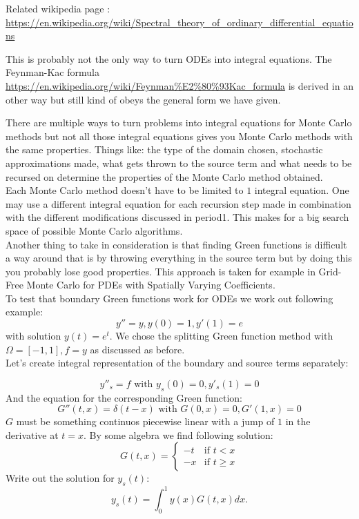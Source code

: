 \documentclass[a4paper,12pt]{article}
\begin{document}
Related wikipedia page :
\url{https://en.wikipedia.org/wiki/Spectral_theory_of_ordinary_differential_equations}

This is probably not the only way to turn ODEs into integral equations. The Feynman-Kac formula
\url{https://en.wikipedia.org/wiki/Feynman%E2%80%93Kac_formula} 
is derived in an other way but still kind of obeys the general form we have given.

There are multiple ways to turn problems into integral equations for Monte Carlo methods
but not all those integral equations gives you Monte Carlo methods with the same properties.
Things like: the type of the domain chosen, stochastic approximations made, what gets thrown
to the source term and what needs to be recursed on determine the properties of the Monte
Carlo method obtained.\\

Each Monte Carlo method doesn't have to be limited to $1$ integral equation.
One may use a different integral equation for each recursion step made in combination
with the different modifications discussed in period1. This makes for a big search space
of possible Monte Carlo algorithms. \\


Another thing to take in consideration is that finding Green functions is difficult a way
around that is by throwing everything in the source term but by doing this you probably
lose good properties. This approach is taken for example in Grid-Free Monte Carlo for
PDEs with Spatially Varying Coefficients. \\

To test that boundary Green functions work for ODEs we work out following example:
$$
    y'' = y, y(0) = 1, y'(1)=e
$$
with solution $y(t) = e^{t}$. We chose the splitting Green function method with
$\Omega = [-1,1],f = y$ as discussed as before. \\

Let's create integral representation of the boundary and source terms separately:

$$
    y''_{s} = f \text{ with } y_s(0)=0, y'_s(1)=0
$$
And the equation for the corresponding Green function:
$$
    G''(t,x) = \delta(t-x) \text{ with } G(0,x)=0, G'(1,x)=0
$$
$G$ must be something continuos piecewise linear with a jump of $1$ in the derivative
at $t = x$. By some algebra we find following solution:
$$
    G(t,x) =
    \begin{cases}
        -t & \text{if } t <  x   \\
        -x & \text{if } t \ge  x
    \end{cases}
$$
Write out the solution for $y_{s}(t)$:
$$
    y_{s}(t) = \int_{0}^{1} y(x) G(t,x) dx.
$$
\end{document}
